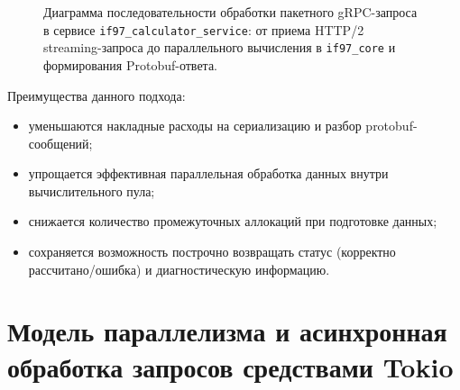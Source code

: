 \begin{figure}[htbp]
{
    }
    
    \caption{Диаграмма последовательности обработки пакетного gRPC-запроса в сервисе \texttt{if97\_calculator\_service}: от приема HTTP/2 streaming-запроса до параллельного вычисления в \texttt{if97\_core} и формирования Protobuf-ответа.}
    \label{fig:grpc-sequence-if97-service}
\end{figure}

Преимущества данного подхода:
\begin{itemize}
\item уменьшаются накладные расходы на сериализацию и разбор protobuf-сообщений;  
\item упрощается эффективная параллельная обработка данных внутри вычислительного пула;  
\item снижается количество промежуточных аллокаций при подготовке данных;  
\item сохраняется возможность построчно возвращать статус (корректно рассчитано/ошибка) и диагностическую информацию.  
\end{itemize}

\section[Параллелизм и асинхронная обработка запросов]{Модель параллелизма и асинхронная обработка запросов средствами Tokio}

